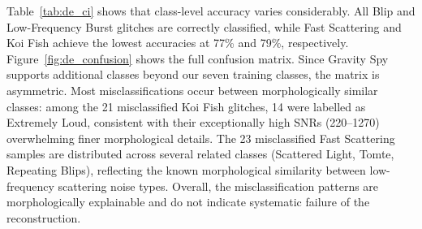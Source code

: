 \documentclass[reprint,nofootinbib,amsmath,amssymb,aps,floatfix]{revtex4-2}
\begin{document}
\begin{table}[h]
\centering
\caption{Gravity Spy classification results for DeepExtractor reconstructions ($n=100$ samples per class, 700 total). Accuracy intervals use the Wilson score method; confidence intervals use a percentile bootstrap (10{,}000 resamples).}
\label{tab:de_ci}
\end{table}

Table~\ref{tab:de_ci} shows that class-level accuracy varies considerably.
All Blip and Low-Frequency Burst glitches are correctly classified, while Fast Scattering and Koi Fish achieve the lowest accuracies at 77\% and 79\%, respectively.
Figure~\ref{fig:de_confusion} shows the full confusion matrix.
Since Gravity Spy supports additional classes beyond our seven training classes, the matrix is asymmetric.
Most misclassifications occur between morphologically similar classes: among the 21 misclassified Koi Fish glitches, 14 were labelled as Extremely Loud, consistent with their exceptionally high SNRs (220--1270) overwhelming finer morphological details.
The 23 misclassified Fast Scattering samples are distributed across several related classes (Scattered Light, Tomte, Repeating Blips), reflecting the known morphological similarity between low-frequency scattering noise types.
Overall, the misclassification patterns are morphologically explainable and do not indicate systematic failure of the reconstruction.
\end{document}
